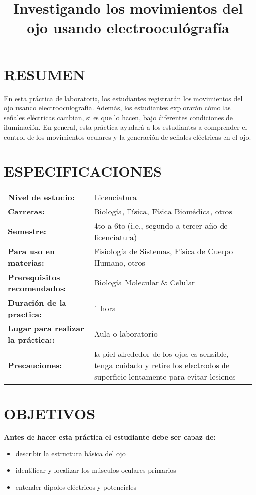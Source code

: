\documentclass[12pt]{article}
\title{\vspace{-1.8cm}\Large{\textbf{Investigando los movimientos del ojo usando electrooculógrafía}}}
\author{}
\date{}
\begin{document}
\maketitle

\vspace{-1.4cm}

\section*{RESUMEN}

En esta práctica de laboratorio, los estudiantes registrarán los
movimientos del ojo usando electrooculografía. Además, los estudiantes
explorarán cómo las señales eléctricas cambian, si es que lo hacen,
bajo diferentes condiciones de iluminación. En general, esta práctica
ayudará a los estudiantes a comprender el control de los movimientos
oculares y la generación de señales eléctricas en el ojo.

\section*{ESPECIFICACIONES}
\begin{tabular}{p{6cm} p{10cm}}
\textbf{Nivel de estudio:} & Licenciatura \\
\textbf{Carreras:} & Biología, Física, Física Biomédica, otros \\
\textbf{Semestre:} & 4to a 6to (i.e., segundo a tercer año de licenciatura) \\ 
\textbf{Para uso en materias:} & Fisiología de Sistemas, Física de Cuerpo Humano, otros \\
\textbf{Prerequisitos recomendados:} & Biología Molecular \& Celular \\
\textbf{Duración de la practica:} & 1 hora \\
\textbf{Lugar para realizar la práctica::} & Aula o laboratorio \\
\textbf{Precauciones:} & la piel alrededor de los ojos es sensible; tenga cuidado y retire los electrodos de superficie lentamente para evitar lesiones \\
\end{tabular}

\section*{OBJETIVOS}
\textbf{Antes de hacer esta práctica el estudiante debe ser capaz de:}
\begin{itemize}
\item describir la estructura básica del ojo
\item identificar y localizar los músculos oculares primarios
\item entender dipolos eléctricos y potenciales 
\end{itemize}
 
\end{document}
